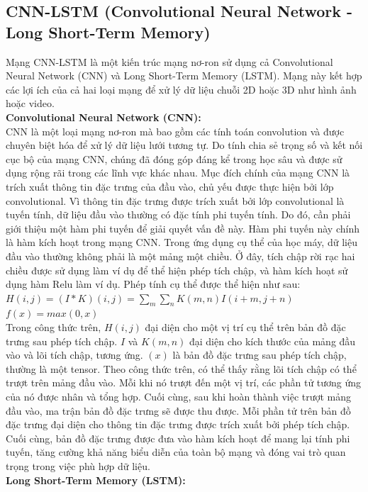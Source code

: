 \documentclass[conference]{IEEEtran}
\begin{document}
\subsection{CNN-LSTM (Convolutional Neural Network - Long Short-Term Memory)}
Mạng CNN-LSTM là một kiến trúc mạng nơ-ron sử dụng cả Convolutional Neural Network (CNN) và Long Short-Term Memory (LSTM). Mạng này kết hợp các lợi ích của cả hai loại mạng để xử lý dữ liệu chuỗi 2D hoặc 3D như hình ảnh hoặc video.\\
\textbf{Convolutional Neural Network (CNN):}\\
CNN là một loại mạng nơ-ron mà bao gồm các tính toán convolution và được chuyên biệt hóa để xử lý dữ liệu lưới tương tự. Do tính chia sẻ trọng số và kết nối cục bộ của mạng CNN, chúng đã đóng góp đáng kể trong học sâu và được sử dụng rộng rãi trong các lĩnh vực khác nhau. Mục đích chính của mạng CNN là trích xuất thông tin đặc trưng của đầu vào, chủ yếu được thực hiện bởi lớp convolutional. Vì thông tin đặc trưng được trích xuất bởi lớp convolutional là tuyến tính, dữ liệu đầu vào thường có đặc tính phi tuyến tính. Do đó, cần phải giới thiệu một hàm phi tuyến để giải quyết vấn đề này. Hàm phi tuyến này chính là hàm kích hoạt trong mạng CNN. Trong ứng dụng cụ thể của học máy, dữ liệu đầu vào thường không phải là một mảng một chiều. Ở đây, tích chập rời rạc hai chiều được sử dụng làm ví dụ để thể hiện phép tích chập, và hàm kích hoạt sử dụng hàm Relu làm ví dụ. Phép tính cụ thể được thể hiện như sau:\\
$H(i,j) = (I*K)(i,j) = \sum_{m}\sum_{n} K(m,n)I(i+m, j+n)$\\
$f(x) = max(0,x)$\\
Trong công thức trên, $H(i,j)$ đại diện cho một vị trí cụ thể trên bản đồ đặc trưng sau phép tích chập. $I$ và $K(m,n)$ đại diện cho kích thước của mảng đầu vào và lõi tích chập, tương ứng. $(x)$ là bản đồ đặc trưng sau phép tích chập, thường là một tensor. Theo công thức trên, có thể thấy rằng lõi tích chập có thể trượt trên mảng đầu vào. Mỗi khi nó trượt đến một vị trí, các phần tử tương ứng của nó được nhân và tổng hợp. Cuối cùng, sau khi hoàn thành việc trượt mảng đầu vào, ma trận bản đồ đặc trưng sẽ được thu được. Mỗi phần tử trên bản đồ đặc trưng đại diện cho thông tin đặc trưng được trích xuất bởi phép tích chập. Cuối cùng, bản đồ đặc trưng được đưa vào hàm kích hoạt để mang lại tính phi tuyến, tăng cường khả năng biểu diễn của toàn bộ mạng và đóng vai trò quan trọng trong việc phù hợp dữ liệu.\\
\textbf{Long Short-Term Memory (LSTM):}\\
\end{document}
